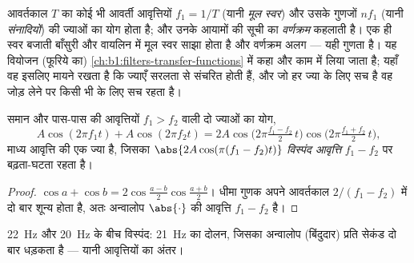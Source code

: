 \begin{remark}[वर्णक्रम]\label{rem:b1:wave-propagation:spectrum}
आवर्तकाल $T$ का कोई भी आवर्ती  आवृत्तियों
$f_1 = 1/T$ (यानी \emph{मूल स्वर}) और उसके गुणजों $nf_1$ (यानी
\emph{संनादियों}) की ज्याओं का योग होता है; और उनके आयामों की सूची  का
\emph{वर्णक्रम} कहलाती है। एक ही स्वर बजाती बाँसुरी और वायलिन में मूल स्वर
साझा होता है और वर्णक्रम अलग --- यही गुणता है। यह वियोजन (फूरिये का)
\cref{ch:b1:filters-transfer-functions} में कहा और काम में लिया जाता है;
यहाँ वह इसलिए मायने रखता है कि ज्याएँ सरलता से संचरित होती हैं, और जो हर ज्या
के लिए सच है वह जोड़ लेने पर किसी भी  के लिए सच रहता है।
\end{remark}

\begin{proposition}[विस्पंद]\label{prop:b1:wave-propagation:beats}
समान  और पास-पास की आवृत्तियों $f_1 > f_2$ वाली दो ज्याओं का
योग,
\[
A\cos(2\pi f_1 t) + A\cos(2\pi f_2 t)
= 2A\cos\!\big(2\pi\tfrac{f_1 - f_2}{2}\,t\big)\cos\!\big(2\pi\tfrac{f_1 + f_2}{2}\,t\big),
\]
माध्य आवृत्ति की एक ज्या है, जिसका 
$\abs{2A\cos(\pi(f_1 - f_2)t)}$ \emph{विस्पंद आवृत्ति} $f_1 - f_2$ पर
बढ़ता-घटता रहता है।
\end{proposition}

\begin{proof}
$\cos a + \cos b = 2\cos\frac{a - b}{2}\cos\frac{a + b}{2}$। धीमा गुणक अपने
आवर्तकाल $2/(f_1 - f_2)$ में दो बार शून्य होता है, अतः
अन्वालोप $\abs{\cdot}$ की आवृत्ति $f_1 - f_2$ है।
\end{proof}

\begin{omfigure}

{\small \qty{22}{Hz} और \qty{20}{Hz} के बीच विस्पंद: \qty{21}{Hz} का
दोलन, जिसका अन्वालोप (बिंदुदार) प्रति सेकंड दो बार धड़कता है --- यानी
आवृत्तियों का अंतर।}
\end{omfigure}

